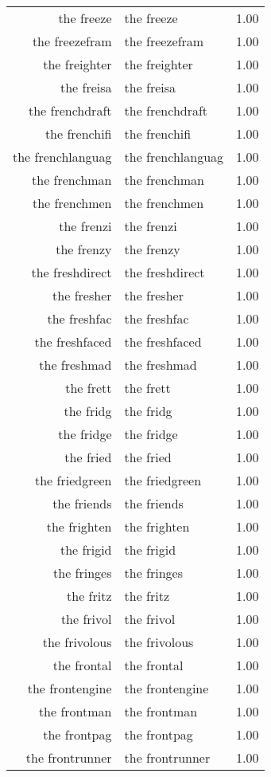 \begin{table}[ht]
\begin{tabular}{rlr}
  the freeze & the freeze & 1.00 \\ 
  the freezefram & the freezefram & 1.00 \\ 
  the freighter & the freighter & 1.00 \\ 
  the freisa & the freisa & 1.00 \\ 
  the frenchdraft & the frenchdraft & 1.00 \\ 
  the frenchifi & the frenchifi & 1.00 \\ 
  the frenchlanguag & the frenchlanguag & 1.00 \\ 
  the frenchman & the frenchman & 1.00 \\ 
  the frenchmen & the frenchmen & 1.00 \\ 
  the frenzi & the frenzi & 1.00 \\ 
  the frenzy & the frenzy & 1.00 \\ 
  the freshdirect & the freshdirect & 1.00 \\ 
  the fresher & the fresher & 1.00 \\ 
  the freshfac & the freshfac & 1.00 \\ 
  the freshfaced & the freshfaced & 1.00 \\ 
  the freshmad & the freshmad & 1.00 \\ 
  the frett & the frett & 1.00 \\ 
  the fridg & the fridg & 1.00 \\ 
  the fridge & the fridge & 1.00 \\ 
  the fried & the fried & 1.00 \\ 
  the friedgreen & the friedgreen & 1.00 \\ 
  the friends & the friends & 1.00 \\ 
  the frighten & the frighten & 1.00 \\ 
  the frigid & the frigid & 1.00 \\ 
  the fringes & the fringes & 1.00 \\ 
  the fritz & the fritz & 1.00 \\ 
  the frivol & the frivol & 1.00 \\ 
  the frivolous & the frivolous & 1.00 \\ 
  the frontal & the frontal & 1.00 \\ 
  the frontengine & the frontengine & 1.00 \\ 
  the frontman & the frontman & 1.00 \\ 
  the frontpag & the frontpag & 1.00 \\ 
  the frontrunner & the frontrunner & 1.00 \\ 

\end{tabular}
\end{table}
